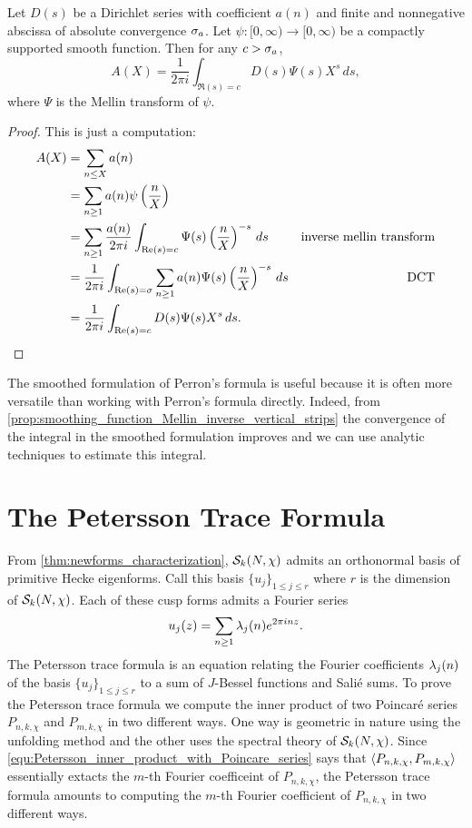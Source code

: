       \begin{theorem}
        Let $D(s)$ be a Dirichlet series with coefficient $a(n)$ and finite and nonnegative abscissa of absolute convergence $\sigma_{a}$. Let $\psi:[0,\infty) \to [0,\infty)$ be a compactly supported smooth function. Then for any $c > \sigma_{a}$,
        \[
          A(X) = \frac{1}{2\pi i}\int_{\Re(s) = c}D(s)\Psi(s)X^{s}\,ds,
        \]
        where $\Psi$ is the Mellin transform of $\psi$.
      \end{theorem}
      \begin{proof}
        This is just a computation:
        \begin{align*}
          A(X) &= \sum_{n \le X}a(n) \\
          &= \sum_{n \ge 1}a(n)\psi\left(\frac{n}{X}\right) \\
          &= \sum_{n \ge 1}\frac{a(n)}{2\pi i}\int_{\mathrm{Re}(s) = c}\Psi(s)\left(\frac{n}{X}\right)^{-s}\,ds & \text{inverse mellin transform} \\
          &= \frac{1}{2\pi i}\int_{\mathrm{Re}(s) = \sigma}\sum_{n \ge 1}a(n)\Psi(s)\left(\frac{n}{X}\right)^{-s}\,ds & \text{DCT} \\
          &= \frac{1}{2\pi i}\int_{\mathrm{Re}(s) = c}D(s)\Psi(s)X^{s}\,ds. \\
      \end{align*}
      \end{proof}

      The smoothed formulation of Perron's formula is useful because it is often more versatile than working with Perron's formula directly. Indeed, from \cref{prop:smoothing_function_Mellin_inverse_vertical_strips} the convergence of the integral in the smoothed formulation improves and we can use analytic techniques to estimate this integral.
    \section{The Petersson Trace Formula}
      From \cref{thm:newforms_characterization}, $\mathcal{S}_{k}(N,\chi)$ admits an orthonormal basis of primitive Hecke eigenforms. Call this basis $\{u_{j}\}_{1 \le j \le r}$ where $r$ is the dimension of $\mathcal{S}_{k}(N,\chi)$. Each of these cusp forms admits a Fourier series
      \[
        u_{j}(z) = \sum_{n \ge 1}\lambda_{j}(n)e^{2\pi inz}.
      \]
      The Petersson trace formula is an equation relating the Fourier coefficients $\lambda_{j}(n)$ of the basis $\{u_{j}\}_{1 \le j \le r}$ to a sum of $J$-Bessel functions and Sali\'e sums. To prove the Petersson trace formula we compute the inner product of two Poincar\'e series $P_{n,k,\chi}$ and $P_{m,k,\chi}$ in two different ways. One way is geometric in nature using the unfolding method and the other uses the spectral theory of $\mathcal{S}_{k}(N,\chi)$. Since \cref{equ:Petersson_inner_product_with_Poincare_series} says that $\langle P_{n,k,\chi},P_{m,k,\chi}\rangle$ essentially extacts the $m$-th Fourier coefficeint of $P_{n,k,\chi}$, the Petersson trace formula amounts to computing the $m$-th Fourier coefficient of $P_{n,k,\chi}$ in two different ways.

